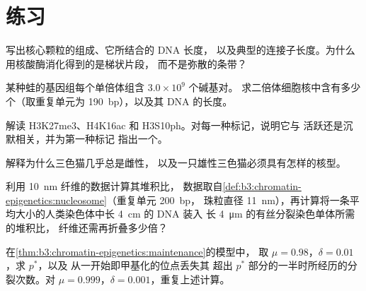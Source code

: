 \section{练习}

\begin{exercise}[$\star$]\label{exo:b3:chromatin-epigenetics:1}
写出核心颗粒的组成、它所结合的 DNA 长度，
以及典型的连接子长度。为什么用核酸酶消化得到的是梯状片段，
而不是弥散的条带？
\end{exercise}

\begin{exercise}[$\star$]\label{exo:b3:chromatin-epigenetics:2}
某种蛙的基因组每个单倍体组含 $3.0\times 10^{9}$ 个碱基对。
求二倍体细胞核中含有多少个（取重复单元为
\qty{190}{bp}），以及其 DNA 的长度。
\end{exercise}

\begin{exercise}[$\star$]\label{exo:b3:chromatin-epigenetics:3}
解读 H3K27me3、H4K16ac 和 H3S10ph。对每一种标记，说明它与
活跃还是沉默相关，并为第一种标记
指出一个。
\end{exercise}

\begin{exercise}[$\star$]\label{exo:b3:chromatin-epigenetics:4}
解释为什么三色猫几乎总是雌性，
以及一只雄性三色猫必须具有怎样的核型。
\end{exercise}

\begin{exercise}[$\star\star$]\label{exo:b3:chromatin-epigenetics:5}
利用 \qty{10}{nm} 纤维的数据计算其堆积比，
数据取自\cref{def:b3:chromatin-epigenetics:nucleosome}（重复单元 \qty{200}{bp}，
珠粒直径 \qty{11}{nm}），再计算将一条平均大小的人类染色体中长 \qty{4}{cm} 的 DNA 装入
长 \qty{4}{\micro m} 的有丝分裂染色单体所需的堆积比，
纤维还需再折叠多少倍？
\end{exercise}

\begin{exercise}[$\star\star$]\label{exo:b3:chromatin-epigenetics:6}
在\cref{thm:b3:chromatin-epigenetics:maintenance}的模型中，
取 $\mu = 0.98$，$\delta = 0.01$，求 $p^{*}$，以及
从一开始即甲基化的位点丢失其
超出 $p^{*}$ 部分的一半时所经历的分裂次数。对 $\mu = 0.999$，$\delta = 0.001$，重复上述计算。
\end{exercise}

